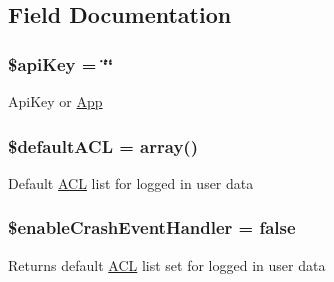 \subsection{Field Documentation}
\hypertarget{class_app42_a_p_i_a084e3db37d1b117a3cc7212cf2eed533}{
\subsubsection[{\$api\+Key}]{\setlength{\rightskip}{0pt plus 5cm}\$api\+Key = \char`\"{}\char`\"{}\hspace{0.3cm}{\ttfamily [static]}}}\label{class_app42_a_p_i_a084e3db37d1b117a3cc7212cf2eed533}
Api\+Key or \hyperlink{class_app}{App} \hypertarget{class_app42_a_p_i_a906279d3ee4d1b4d9aa4e3638fc2e6a9}{
\subsubsection[{\$default\+A\+C\+L}]{\setlength{\rightskip}{0pt plus 5cm}\$default\+A\+C\+L = array()\hspace{0.3cm}{\ttfamily [static]}}}\label{class_app42_a_p_i_a906279d3ee4d1b4d9aa4e3638fc2e6a9}
Default \hyperlink{class_a_c_l}{A\+C\+L} list for logged in user data \hypertarget{class_app42_a_p_i_a22ddedcbbe1f2499c4d28d00faf74f13}{
\subsubsection[{\$enable\+Crash\+Event\+Handler}]{\setlength{\rightskip}{0pt plus 5cm}\$enable\+Crash\+Event\+Handler = false\hspace{0.3cm}{\ttfamily [static]}}}\label{class_app42_a_p_i_a22ddedcbbe1f2499c4d28d00faf74f13}
Returns default \hyperlink{class_a_c_l}{A\+C\+L} list set for logged in user data


